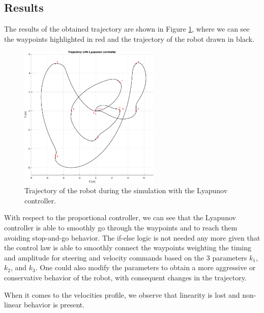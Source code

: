 \subsection{Results}
\label{subsec:lyapunov_results}

The results of the obtained trajectory are shown in Figure \ref{fig:lyapunov_controller_trajectory}, where we can see the waypoints highlighted in red and the trajectory of the robot drawn in black.

\begin{figure}[H]
    \centering
    \includegraphics[width=0.6\textwidth]{./img/MATLAB/trajectory_lyapunov.pdf}
    \caption{Trajectory of the robot during the simulation with the Lyapunov controller.}
    \label{fig:lyapunov_controller_trajectory}
\end{figure}

With respect to the proportional controller, we can see that the Lyapunov controller is able to smoothly go through the waypoints and to reach them avoiding stop-and-go behavior.
The if-else logic is not needed any more given that the control law is able to smoothly connect the waypoints weighting the timing and amplitude for steering and velocity commands based on the 3 parameters $k_1$, $k_2$, and $k_3$.
One could also modify the parameters to obtain a more aggressive or conservative behavior of the robot, with consequent changes in the trajectory.

When it comes to the velocities profile, we observe that linearity is lost and non-linear behavior is present.

